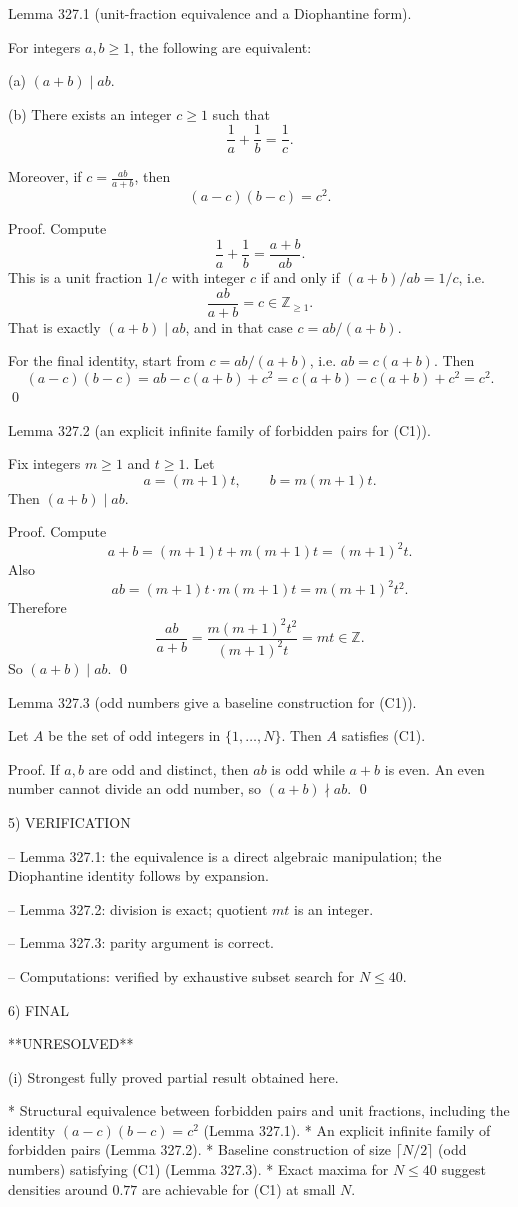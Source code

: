 Lemma 327.1 (unit-fraction equivalence and a Diophantine form).

For integers $a,b\ge 1$, the following are equivalent:

(a) $(a+b)\mid ab$.

(b) There exists an integer $c\ge 1$ such that
\[
\frac1a+\frac1b=\frac1c.
\]

Moreover, if $c=\frac{ab}{a+b}$, then
\[
(a-c)(b-c)=c^2.
\]

Proof.
Compute
\[
\frac1a+\frac1b=\frac{a+b}{ab}.
\]
This is a unit fraction $1/c$ with integer $c$ if and only if $(a+b)/ab=1/c$, i.e.
\[
\frac{ab}{a+b}=c\in\mathbb Z_{\ge 1}.
\]
That is exactly $(a+b)\mid ab$, and in that case $c=ab/(a+b)$.

For the final identity, start from $c=ab/(a+b)$, i.e. $ab=c(a+b)$.
Then
\[
(a-c)(b-c)=ab-c(a+b)+c^2 = c(a+b)-c(a+b)+c^2=c^2.
\]
\qed


Lemma 327.2 (an explicit infinite family of forbidden pairs for (C1)).

Fix integers $m\ge 1$ and $t\ge 1$.
Let
\[
a=(m+1)t,\qquad b=m(m+1)t.
\]
Then $(a+b)\mid ab$.

Proof.
Compute
\[
a+b=(m+1)t+m(m+1)t=(m+1)^2 t.
\]
Also
\[
ab=(m+1)t\cdot m(m+1)t = m(m+1)^2 t^2.
\]
Therefore
\[
\frac{ab}{a+b}=\frac{m(m+1)^2 t^2}{(m+1)^2 t}=mt\in\mathbb Z.
\]
So $(a+b)\mid ab$.
\qed


Lemma 327.3 (odd numbers give a baseline construction for (C1)).

Let $A$ be the set of odd integers in $\{1,\dots,N\}$. Then $A$ satisfies (C1).

Proof.
If $a,b$ are odd and distinct, then $ab$ is odd while $a+b$ is even.
An even number cannot divide an odd number, so $(a+b)\nmid ab$.
\qed


5) VERIFICATION

-- Lemma 327.1: the equivalence is a direct algebraic manipulation; the Diophantine identity follows by expansion.

-- Lemma 327.2: division is exact; quotient $mt$ is an integer.

-- Lemma 327.3: parity argument is correct.

-- Computations: verified by exhaustive subset search for $N\le 40$.


6) FINAL

**UNRESOLVED**

(i) Strongest fully proved partial result obtained here.

* Structural equivalence between forbidden pairs and unit fractions, including the identity $(a-c)(b-c)=c^2$ (Lemma 327.1).
* An explicit infinite family of forbidden pairs (Lemma 327.2).
* Baseline construction of size $\lceil N/2\rceil$ (odd numbers) satisfying (C1) (Lemma 327.3).
* Exact maxima for $N\le 40$ suggest densities around $0.77$ are achievable for (C1) at small $N$.

